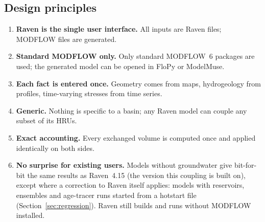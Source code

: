 \subsection{Design principles}
\begin{enumerate}
\item \textbf{Raven is the single user interface.} All inputs are Raven files; MODFLOW files are generated.
\item \textbf{Standard MODFLOW only.} Only standard MODFLOW~6 packages are used; the generated model can be opened in
FloPy or ModelMuse.
\item \textbf{Each fact is entered once.} Geometry comes from maps, hydrogeology from profiles, time-varying stresses
from time series.
\item \textbf{Generic.} Nothing is specific to a basin; any Raven model can couple any subset of its HRUs.
\item \textbf{Exact accounting.} Every exchanged volume is computed once and applied identically on both sides.
\item \textbf{No surprise for existing users.} Models without groundwater give bit-for-bit the same results as
Raven~4.15 (the version this coupling is built on), except where a correction to Raven itself applies: models with
reservoirs, ensembles and age-tracer runs started from a hotstart file (Section~\ref{sec:regression}). Raven still builds
and runs without MODFLOW installed.
\end{enumerate}


